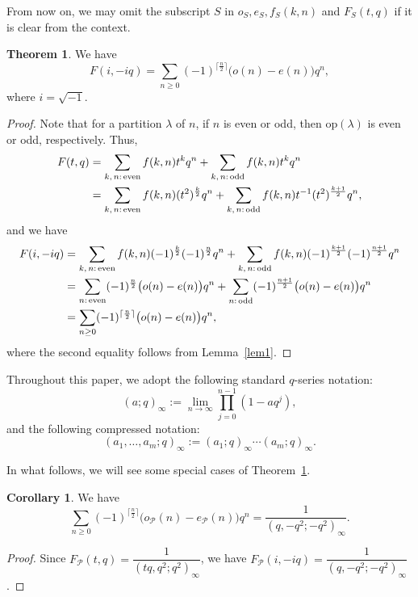 \documentclass[reqno]{amsart}
\theoremstyle{definition}
\newtheorem{thm}{Theorem}%
\newtheorem{cor}{Corollary}%
\newcommand{\op}{\mathrm{op}}
\newcommand{\pa}{\mathcal{P}}
\begin{document}
From now on, we may omit the subscript $S$ in $o_S, e_S, f_S(k,n)$ and $F_S(t,q)$ if it is clear from the context. 
\begin{thm} \label{thm2}
We have
$$
F(i,-iq)
= \sum_{n\ge 0}(-1)^{ \lceil \frac{n}{2} \rceil }\big(o(n) -e(n)\big)q^n ,
$$
where $i=\sqrt{-1}$.
\end{thm}
\begin{proof}
Note that for a partition $\lambda$ of $n$, if  $n$ is even or odd, then $\op(\lambda)$ is even or odd, respectively. Thus, 
\begin{align}
F(t,q)
&=\sum_{\text{$k,n$:\,even}}f(k,n)t^k q^n + \sum_{\text{$k,n$:\,odd}}f(k,n)t^k q^n\notag \\
&=\sum_{\text{$k,n$:\,even}}f(k,n)(t^2)^{\frac{k}{2}} q^n + \sum_{\text{$k,n$:\,odd}}f(k,n)t^{-1}(t^2)^{\frac{k+1}{2}} q^n, \label{Ftq}
\end{align}
and we have
\begin{align*}
F(i,-iq)
&=\sum_{\text{$k,n$:\,even}}f(k,n)(-1)^{\frac{k}{2}}  (-1)^{\frac{n}{2}}q^n + \sum_{\text{$k,n$:\,odd}} f(k,n)(-1)^{\frac{k+1}{2}} (-1)^{\frac{n+1}{2}} q^n\\
&=\sum_{\text{$n$:\,even}}(-1)^{\frac{n}{2}} \big(o(n) -e(n)\big) q^n + \sum_{\text{$n$:\,odd}}(-1)^{\frac{n+1}{2}} \big(o(n) -e(n) \big)  q^n \\
&=\sum_{n \ge 0}(-1)^{ \lceil \frac{n}{2} \rceil } \big(o(n) -e(n) \big)  q^n,
\end{align*}
where the second equality follows from Lemma~\ref{lem1}.
\end{proof}

Throughout this paper, we  adopt the following standard $q$-series notation:
\begin{equation*}
(a;q)_{\infty}:=\lim_{n\to \infty} \prod_{j=0}^{n-1}(1-aq^j),
\end{equation*}
and the following compressed notation:
\begin{equation*}
(a_1,\ldots, a_m;q)_{\infty}:=(a_1;q)_{\infty} \cdots (a_m;q)_{\infty}.
\end{equation*}

In what follows, we will see some special cases of Theorem~\ref{thm2}. 

\begin{cor}
We have 
$$
\sum_{n\ge 0}(-1)^{ \lceil \frac{n}{2} \rceil } \big(o_{\pa}(n) -e_{\pa}(n) \big)q^n = \frac{1}{(q,-q^2;-q^2)_\infty}.
$$
\end{cor}
\begin{proof}
Since $F_{\pa}(t,q)=  \dfrac{1}{(tq,q^2;q^2)_\infty}$, we have $F_{\pa}(i,-iq)=  \dfrac{1}{(q,-q^2;-q^2)_\infty}$.
\end{proof}
\end{document}
